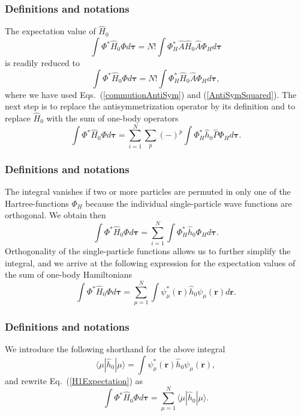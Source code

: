 \documentclass{beamer}
\begin{document}
\begin{frame}
\frametitle{Definitions and notations}

\begin{block}{}
The expectation value of $\hat{H}_0$ 
\[
  \int \Phi^*\hat{H}_0\Phi d\mathbf{\tau} 
  = N! \int \Phi_H^*\hat{A}\hat{H}_0\hat{A}\Phi_H d\mathbf{\tau}
\]
is readily reduced to
\[
  \int \Phi^*\hat{H}_0\Phi d\mathbf{\tau} 
  = N! \int \Phi_H^*\hat{H}_0\hat{A}\Phi_H d\mathbf{\tau},
\]
where we have used Eqs.~(\ref{commutionAntiSym}) and
(\ref{AntiSymSquared}). The next step is to replace the antisymmetrization
operator by its definition and to
replace $\hat{H}_0$ with the sum of one-body operators
\[
  \int \Phi^*\hat{H}_0\Phi  d\mathbf{\tau}
  = \sum_{i=1}^N \sum_{p} (-)^p\int 
  \Phi_H^*\hat{h}_0\hat{P}\Phi_H d\mathbf{\tau}.
\]
\end{block}
\end{frame}

\begin{frame}
\frametitle{Definitions and notations}

\begin{block}{}
The integral vanishes if two or more particles are permuted in only one
of the Hartree-functions $\Phi_H$ because the individual single-particle wave functions are
orthogonal. We obtain then
\[
  \int \Phi^*\hat{H}_0\Phi  d\mathbf{\tau}= \sum_{i=1}^N \int \Phi_H^*\hat{h}_0\Phi_H  d\mathbf{\tau}.
\]
Orthogonality of the single-particle functions allows us to further simplify the integral, and we
arrive at the following expression for the expectation values of the
sum of one-body Hamiltonians 
\begin{equation}
  \int \Phi^*\hat{H}_0\Phi  d\mathbf{\tau}
  = \sum_{\mu=1}^N \int \psi_{\mu}^*(\mathbf{r})\hat{h}_0\psi_{\mu}(\mathbf{r})
  d\mathbf{r}.
  \label{H1Expectation}
\end{equation}
\end{block}
\end{frame}

\begin{frame}
\frametitle{Definitions and notations}

\begin{block}{}
We introduce the following shorthand for the above integral
\[
\langle \mu | \hat{h}_0 | \mu \rangle = \int \psi_{\mu}^*(\mathbf{r})\hat{h}_0\psi_{\mu}(\mathbf{r}),
\]
and rewrite Eq.~(\ref{H1Expectation}) as
\begin{equation}
  \int \Phi^*\hat{H}_0\Phi  d\mathbf{\tau}
  = \sum_{\mu=1}^N \langle \mu | \hat{h}_0 | \mu \rangle.
  \label{H1Expectation1}
\end{equation}
\end{block}
\end{frame}
\end{document}
